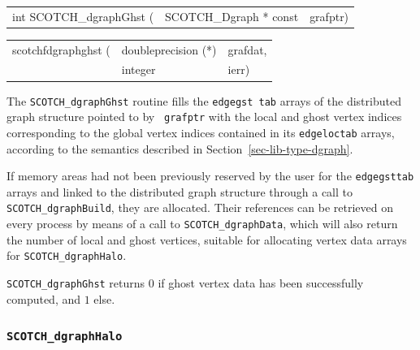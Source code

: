 \begin{itemize}
\progsyn

{\tt\begin{tabular}{l@{}ll}

int SCOTCH\_dgraphGhst ( & SCOTCH\_Dgraph * const & grafptr)
\end{tabular}}

{\tt\begin{tabular}{l@{}ll}
scotchfdgraphghst ( & doubleprecision (*) & grafdat, \\
                    & integer             & ierr)
\end{tabular}}

\progdes

The {\tt SCOTCH\_dgraphGhst} routine fills the {\tt edge\lbt gst\lbt
tab} arrays of the distributed graph structure pointed to by {\tt
grafptr} with the local and ghost vertex indices corresponding to the
global vertex indices contained in its {\tt edge\lbt loc\lbt tab}
arrays, according to the semantics described in
Section~\ref{sec-lib-type-dgraph}.

If memory areas had not been previously reserved by the user for the
{\tt edge\lbt gst\lbt tab} arrays and linked to the distributed graph
structure through a call to {\tt SCOTCH\_\lbt dgraph\lbt Build}, they
are allocated. Their references can be retrieved on every process by
means of a call to {\tt SCOTCH\_\lbt dgraph\lbt Data}, which will also
return the number of local and ghost vertices, suitable for allocating
vertex data arrays for {\tt SCOTCH\_\lbt dgraph\lbt Halo}.

\progret

{\tt SCOTCH\_dgraphGhst} returns $0$ if ghost vertex data has been
successfully computed, and $1$ else.
\end{itemize}

\subsubsection{{\tt SCOTCH\_dgraphHalo}}
\label{sec-lib-func-dgraphhalo}

